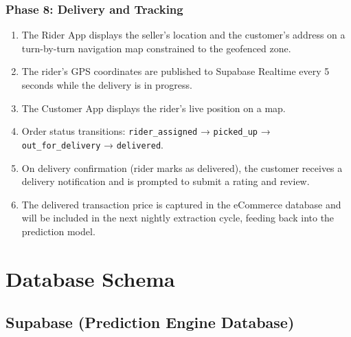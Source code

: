 \documentclass[12pt, a4paper, oneside]{report}
\begin{document}
\subsection{Phase 8: Delivery and Tracking}

\begin{enumerate}
  \item The Rider App displays the seller's location and the customer's address
        on a turn-by-turn navigation map constrained to the geofenced zone.
  \item The rider's GPS coordinates are published to Supabase Realtime every
        5 seconds while the delivery is in progress.
  \item The Customer App displays the rider's live position on a map.
  \item Order status transitions: \texttt{rider\_assigned} →
        \texttt{picked\_up} → \texttt{out\_for\_delivery} → \texttt{delivered}.
  \item On delivery confirmation (rider marks as delivered), the customer
        receives a delivery notification and is prompted to submit a rating
        and review.
  \item The delivered transaction price is captured in the eCommerce database
        and will be included in the next nightly extraction cycle, feeding
        back into the prediction model.
\end{enumerate}

\chapter{Database Schema}

\section{Supabase (Prediction Engine Database)}
\end{document}
